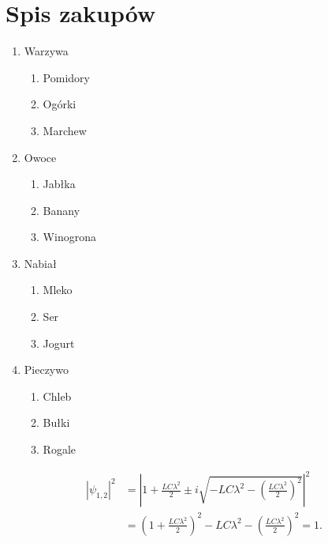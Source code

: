 \documentclass[a4paper]{article}
\begin{document}
\section*{Spis zakupów}

\begin{enumerate}[label=\arabic*.]
    \item Warzywa
    \begin{enumerate}[label=\alph*)]
        \item Pomidory
        \item Ogórki
        \item Marchew
    \end{enumerate}
    
    \item Owoce
    \begin{enumerate}[label=\Roman*.]
        \item Jabłka
        \item Banany
        \item Winogrona
    \end{enumerate}
    
    \item Nabiał
    \begin{enumerate}[label=\roman*)]
        \item Mleko
        \item Ser
        \item Jogurt
    \end{enumerate}
    
    \item Pieczywo
    \begin{enumerate}[label=\Alph*)]
        \item Chleb
        \item Bułki
        \item Rogale
    \end{enumerate}
\end{enumerate}
\begin{align}
|\psi_{1,2}|^2 &= \left| 1 + \frac{LC \lambda^2}{2} \pm i \sqrt{-LC \lambda^2 - \left( \frac{LC \lambda^2}{2} \right)^2} \right|^2 \nonumber \\
&= \left( 1 + \frac{LC \lambda^2}{2} \right)^2 - LC \lambda^2 - \left( \frac{LC \lambda^2}{2} \right)^2 = 1. \tag{1}
\end{align}
\end{document}
